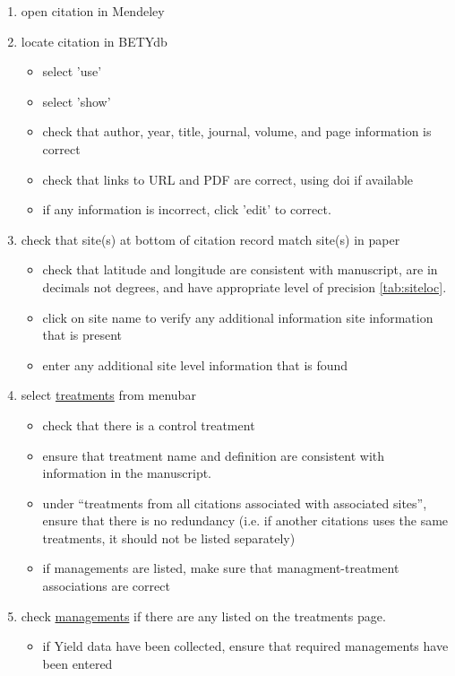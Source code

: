 \documentclass[12pt,english,portrait]{article}
\begin{document}
 \begin{enumerate}
 \item open citation in Mendeley
 \item locate citation in BETYdb
   \begin{itemize}
   \item select 'use'
   \item select 'show'
   \item check that author, year, title, journal, volume, and page information is correct
   \item check that links to URL and PDF are correct, using doi if available
   \item if any information is incorrect, click 'edit' to correct.
   \end{itemize}
 \item check that site(s) at bottom of citation record match site(s) in paper
   \begin{itemize}
   \item check that latitude and longitude are consistent with manuscript, are in decimals not degrees, and have appropriate level of precision \autoref{tab:siteloc}.
   \item click on site name to verify any additional information site information that is present
   \item enter any additional site level information that is found
   \end{itemize}
 \item select  \href{http://ebi-forecast.igb.uiuc.edu/bety/treatments/}{treatments} from menubar
   \begin{itemize}
   \item check that there is a control treatment
   \item ensure that treatment name and definition are consistent with information in the manuscript.
   \item under ``treatments from all citations associated with associated sites'', ensure that there is no redundancy (i.e. if another citations uses the same treatments, it should not be listed separately)
   \item if managements are listed, make sure that managment-treatment associations are correct
   \end{itemize}
 \item check \href{http://ebi-forecast.igb.uiuc.edu/bety/managements/}{managements} if there are any listed on the treatments page.
   \begin{itemize}
   \item if Yield data have been collected, ensure that required managements have been entered

\end{itemize}
\end{enumerate}
\end{document}
